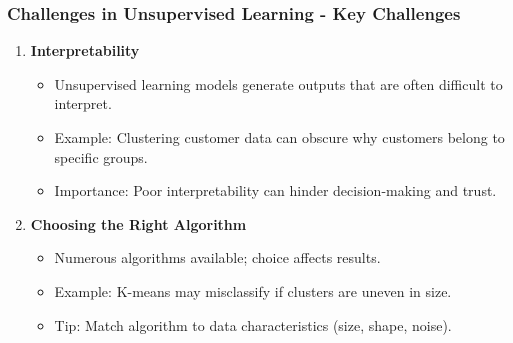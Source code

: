 \documentclass[aspectratio=169]{beamer}
\begin{document}
\begin{frame}[fragile]
    \frametitle{Challenges in Unsupervised Learning - Key Challenges}
    \begin{enumerate}
        \item \textbf{Interpretability}
            \begin{itemize}
                \item Unsupervised learning models generate outputs that are often difficult to interpret.
                \item Example: Clustering customer data can obscure why customers belong to specific groups.
                \item Importance: Poor interpretability can hinder decision-making and trust.
            \end{itemize}

        \item \textbf{Choosing the Right Algorithm}
            \begin{itemize}
                \item Numerous algorithms available; choice affects results.
                \item Example: K-means may misclassify if clusters are uneven in size.
                \item Tip: Match algorithm to data characteristics (size, shape, noise).
            \end{itemize}
    \end{enumerate}
\end{frame}
\end{document}
